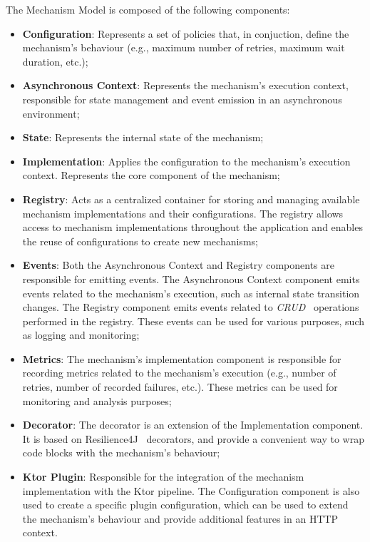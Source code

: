 The Mechanism Model is composed of the following components:
\begin{itemize}
    \item \textbf{Configuration}: Represents a set of policies that, in conjuction, define the mechanism's behaviour (e.g., maximum number of retries, maximum wait duration, etc.);
    \item \textbf{Asynchronous Context}: Represents the mechanism's execution context, responsible for state management and event emission in an asynchronous environment;
    \item \textbf{State}: Represents the internal state of the mechanism;
    \item \textbf{Implementation}: Applies the configuration to the mechanism's execution context.
    Represents the core component of the mechanism;
    \item \textbf{Registry}: Acts as a centralized container for storing and managing available mechanism implementations and their configurations.
    The registry allows access to mechanism implementations throughout the application and enables the reuse of configurations to create new mechanisms;
    \item \textbf{Events}: Both the Asynchronous Context and Registry components are responsible for emitting events.
    The Asynchronous Context component emits events related to the mechanism's execution, such as internal state transition changes.
    The Registry component emits events related to \textit{CRUD}~\cite{wiki:crud-operations} operations performed in the registry.
    These events can be used for various purposes, such as logging and monitoring;
    \item \textbf{Metrics}: The mechanism's implementation component is responsible for recording metrics related to the mechanism's execution (e.g., number of retries, number of recorded failures, etc.).
    These metrics can be used for monitoring and analysis purposes;
    \item \textbf{Decorator}: The decorator is an extension of the Implementation component.
    It is based on Resilience4J~\cite{resilience4j} decorators, and provide a convenient way to wrap code blocks with the mechanism's behaviour;
    \item \textbf{Ktor Plugin}: Responsible for the integration of the mechanism implementation with the Ktor pipeline.
    The Configuration component is also used to create a specific plugin configuration,
    which can be used to extend the mechanism's behaviour and provide additional features in an HTTP context.
\end{itemize}

